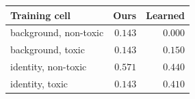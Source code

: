 \begin{tabular}{lrr}
\toprule
Training cell & Ours & Learned \\
\midrule
background, non-toxic & $0.143$ & $0.000$ \\
background, toxic & $0.143$ & $0.150$ \\
identity, non-toxic & $0.571$ & $0.440$ \\
identity, toxic & $0.143$ & $0.410$ \\
\bottomrule
\end{tabular}
